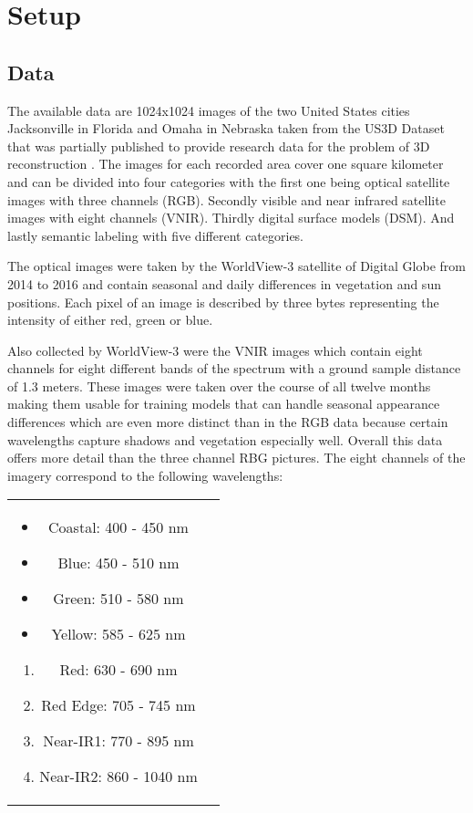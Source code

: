 \section{Setup}

\subsection{Data}

The available data are 1024x1024 images of the two United States cities Jacksonville
in Florida and Omaha in Nebraska taken from the US3D Dataset that
was partially published to provide research data for the problem
of 3D reconstruction \parencite{2019-bosch-semantic}.
The images for each recorded area cover one square kilometer and can be divided 
into four categories with the first one being optical satellite images with three channels (RGB). 
Secondly visible and near infrared satellite images with eight channels (VNIR). 
Thirdly digital surface models (DSM). And lastly semantic labeling with five different categories.
\medskip

The optical images were taken by the WorldView-3 satellite of Digital Globe from 2014 to 2016
and contain seasonal and daily differences in vegetation and sun positions. 
Each pixel of an image is described by three bytes representing the intensity of either red, green or blue.

Also collected by WorldView-3 were the VNIR images which contain eight channels for eight different 
bands of the spectrum with a ground sample distance of 1.3 meters. These images were taken over the 
course of all twelve months making them usable for training models that can handle seasonal 
appearance differences which are even more distinct than in the RGB data because certain 
wavelengths capture shadows and vegetation especially well. Overall this data offers more 
detail than the three channel RBG pictures. The eight channels of the imagery correspond 
to the following wavelengths:

\begin{tabular} {c c}
    \parbox{5cm}{
        \begin{itemize}
            \item Coastal: 400 - 450 nm 			
            \item Blue: 450 - 510 nm			
            \item Green: 510 - 580 nm 			
            \item Yellow: 585 - 625 nm
        \end{itemize}
    }
    \parbox{5cm}{
        \begin{enumerate} 			
            \item Red: 630 - 690 nm
            \item Red Edge: 705 - 745 nm
            \item Near-IR1: 770 - 895 nm
            \item Near-IR2: 860 - 1040 nm
        \end{enumerate}
    }
\end{tabular}
\bigskip

